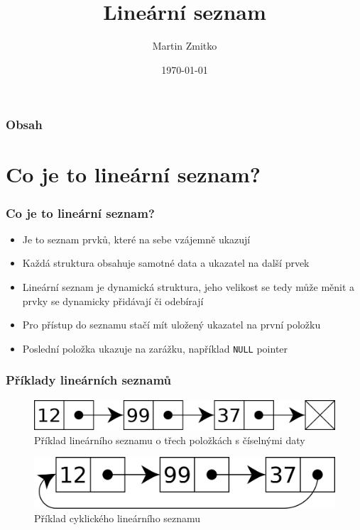 \documentclass{beamer}
\title{Lineární seznam}
\author{Martin Zmitko}
\institute[VUT FIT]{Vysoké učení technické v Brně\\
Fakulta informačních technologií}
\date{\today}
\begin{document}
\frame{\titlepage}

\begin{frame}
\frametitle{Obsah}
\tableofcontents
\end{frame}

\section{Co je to lineární seznam?}
\begin{frame}
\frametitle{Co je to lineární seznam?}
\begin{itemize}
    \item Je to seznam prvků, které na sebe vzájemně ukazují
    \item Každá struktura obsahuje samotné data a ukazatel na další prvek
    \item Lineární seznam je dynamická struktura, jeho velikost se tedy může měnit a prvky se dynamicky přidávají či odebírají
    \item Pro přístup do seznamu stačí mít uložený ukazatel na první položku
    \item Poslední položka ukazuje na zarážku, například \texttt{NULL} pointer
\end{itemize}
\end{frame}

\begin{frame}
\frametitle{Příklady lineárních seznamů}
\begin{figure}[h]
\centering
\includegraphics[width=\textwidth]{list.png}
\caption{Příklad lineárního seznamu o třech položkách s číselnými daty}
\end{figure}
\begin{figure}[h]
\centering
\includegraphics[width=\textwidth]{circular.png}
\caption{Příklad cyklického lineárního seznamu}
\end{figure}
\end{frame}
\end{document}
